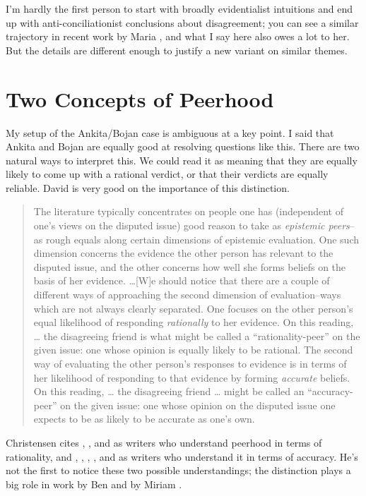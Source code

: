 I'm hardly the first person to start with broadly evidentialist intuitions and end up with anti-conciliationist conclusions about disagreement; you can see a similar trajectory in recent work by Maria \citet{Lasonen-Aarnio2013, Lasonen-Aarnio2014}, and what I say here also owes a lot to her. But the details are different enough to justify a new variant on similar themes.

\section{Two Concepts of Peerhood}
\label{twoconceptsofpeerhood}

My setup of the \gls{Ankita}\slash \gls{Bojan} case is ambiguous at a key point. I said that \gls{Ankita} and \gls{Bojan} are equally good at resolving questions like this. There are two natural ways to interpret this. We could read it as meaning that they are equally likely to come up with a rational verdict, or that their verdicts are equally reliable. David \citet{Christensen2014} is very good on the importance of this distinction.

\begin{quote}
The literature typically concentrates on people one has (independent of one's views on the disputed issue) good reason to take as \emph{epistemic peers}--as rough equals along certain dimensions of epistemic evaluation. One such dimension concerns the evidence the other person has relevant to the disputed issue, and the other concerns how well she forms beliefs on the basis of her evidence. {\ldots}[W]e should notice that there are a couple of different ways of approaching the second dimension of evaluation--ways which are not always clearly separated. One focuses on the other person's equal likelihood of responding \emph{rationally} to her evidence. On this reading, {\ldots} the disagreeing friend is what might be called a ``rationality-peer'' on the given issue: one whose opinion is equally likely to be rational. The second way of evaluating the other person's responses to evidence is in terms of her likelihood of responding to that evidence by forming \emph{accurate} beliefs. On this reading, {\ldots} the disagreeing friend {\ldots} might be called an ``accuracy-peer'' on the given issue: one whose opinion on the disputed issue one expects to be as likely to be accurate as one's own. ~\citep[3]{Christensen2014}
\end{quote}
Christensen cites \citet{Feldman2007}, \citet{Kelly2005}, \citet{Christensen2007c} and \citet{Cohen2013} as writers who understand peerhood in terms of rationality, and \citet{Elga2007}, \citet{White2009}, \citet{Enoch2010}, \citet{Kelly2010}, \citet{Lam2011} and \citet{Levinstein2013} as writers who understand it in terms of accuracy. He's not the first to notice these two possible understandings; the distinction plays a big role in work by Ben \citet{Levinstein2013} and by Miriam \citet{Schoenfield2014b}.

